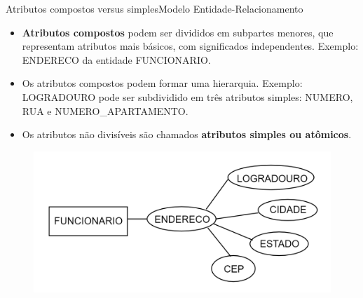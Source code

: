 \documentclass[t]{beamer}
\begin{document}
\begin{ftst}{Atributos compostos versus simples}{Modelo Entidade-Relacionamento}
\small
\begin{itemize}
    \item \textbf{Atributos compostos} podem ser divididos em subpartes menores, que representam atributos mais básicos, com significados independentes. Exemplo: ENDERECO da entidade FUNCIONARIO.
    
    \item Os atributos compostos podem formar uma hierarquia. Exemplo: LOGRADOURO pode ser subdividido em três atributos simples: NUMERO, RUA e NUMERO\_APARTAMENTO.
    
    \item Os atributos não divisíveis são chamados \textbf{atributos simples ou atômicos}. 
\end{itemize}

\begin{figure}
    \centering
    \includegraphics[scale=0.15]{Figuras/01_5.png}
\end{figure}

\end{ftst}

\end{document}
